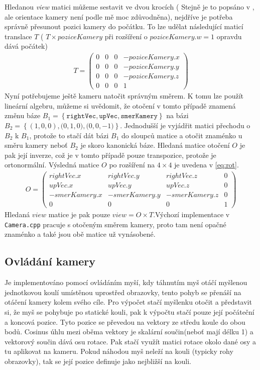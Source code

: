 Hledanou \textit{view} matici můžeme sestavit ve dvou krocích ( Stejně je to popsáno v \cite{lookAt}, ale orientace kamery není podle mě moc zdůvodněna), nejdříve je potřeba správně přesunout pozici kamery do počátku. To lze udělat následující maticí translace $ T $ ( $ T\times poziceKamery $ při rozšíření o $ poziceKamery.w=1 $ opravdu dává počátek)
\begin{align}
T=
\begin{pmatrix}
0 & 0 & 0 & -poziceKamery.x\\
0 & 0 & 0 & -poziceKamery.y\\
0 & 0 & 0 & -poziceKamery.z\\
0 & 0 & 0 & 1
\end{pmatrix}
\end{align}
Nyní potřebujeme ještě kameru natočit správným směrem. K tomu lze použít lineární algebru, můžeme si uvědomit, že otočení v tomto případě znamená změnu báze $ B_1 = \left\lbrace \texttt{rightVec},\texttt{upVec},\texttt{smerKamery}\right\rbrace $ na bázi 
$ B_2 = \left\lbrace (1,0,0),\texttt(0,1,0),\texttt(0,0,-1)\right\rbrace $.
Jednodušší je vyjádřit matici přechodu o $ B_2 $ k $ B_1 $, protože to stačí dát bázi $ B_1 $ do sloupců matice a otočit znaménko u směru kamery neboť $ B_2 $ je skoro kanonická báze. Hledaná matice otočení $ O $ je pak její inverze, což je v tomto případě pouze transpozice, protože je ortonormální. Výsledná matice $ O $ po rozšíření na $ 4\times4 $ je uvedena v \ref{eq:rot}. 
\begin{align}
\label{eq:rot}
O=
\begin{pmatrix}
rightVec.x & rightVec.y & rightVec.z & 0\\
upVec.x & upVec.y & upVec.z & 0\\
-smerKamery.x & -smerKamery.y & -smerKamery.z & 0\\
0 & 0 & 0 & 1
\end{pmatrix}
\end{align}
Hledaná $ view $ matice je pak pouze $ view=O\times T $.Výchozí implementace v \texttt{Camera.cpp} pracuje s otočeným směrem kamery, proto tam není opačné znaménko a také jsou obě matice už vynásobené.

\subsection{Ovládání kamery}

Je implementováno pomocí ovládáním myší, kdy táhnutím myš otáčí myšlenou jednotkovou koulí umístěnou uprostřed obrazovky, tento pohyb se přenáší na otáčení kamery kolem svého cíle.
Pro výpočet stačí myšlenku otočit a představit si, že myš se pohybuje po statické kouli, pak k výpočtu stačí pouze její počáteční a koncová pozice. Tyto pozice se převedou na vektory ze středu koule do obou bodů. Cosinus úhlu mezi oběma vektory je skalární součin(neboť mají délku 1) a vektorový součin dává osu rotace. Pak stačí využít matici rotace okolo dané osy a tu aplikovat na kameru.
Pokud náhodou myš neleží na kouli (typicky rohy obrazovky), tak se její pozice definuje jako nejbližší na kouli.

